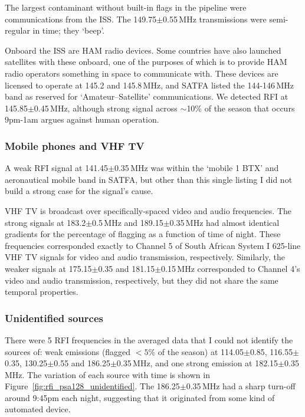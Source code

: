 The largest contaminant without built-in flags in the pipeline were communications from the ISS. The 149.75$\pm$0.55\,MHz transmissions were semi-regular in time; they `beep'. 

Onboard the ISS are HAM radio devices. Some countries have also launched satellites with these onboard, one of the purposes of which is to provide HAM radio operators something in space to communicate with. These devices are licensed to operate at 145.2 and 145.8\,MHz, and SATFA listed the 144-146\,MHz band as reserved for `Amateur--Satellite' communications. We detected RFI at 145.85$\pm$0.45\,MHz, although strong signal across $\sim$10\% of the season that occurs 9pm-1am argues against human operation.

\subsubsection*{Mobile phones and VHF TV}
A weak RFI signal at 141.45$\pm$0.35\,MHz was within the `mobile 1 BTX'  and aeronautical mobile band in SATFA, but other than this single listing I did not build a strong case for the signal's cause.

VHF TV is broadcast over specifically-spaced video and audio frequencies. The strong signals at 183.2$\pm$0.5\,MHz and 189.15$\pm$0.35\,MHz had almost identical gradients for the percentage of flagging as a function of time of night. These frequencies corresponded exactly to Channel 5 of South African System I 625-line VHF TV signals for video and audio transmission, respectively. Similarly, the weaker signals at 175.15$\pm$0.35	 and 181.15$\pm$0.15\,MHz corresponded to Channel 4's video and audio transmission, respectively, but they did not share the same temporal properties.

\subsubsection*{Unidentified sources}

There were 5 RFI frequencies in the averaged data that I could not identify the sources of:  weak emissions (flagged $<5\%$ of the season) at 114.05$\pm$0.85, 116.55$\pm$0.35, 130.25$\pm$0.55 and 186.25$\pm$0.35\,MHz, and one strong emission at 182.15$\pm$0.35\,MHz. The variation of each source with time is shown in Figure~\ref{fig:rfi_psa128_unidentified}. The 186.25$\pm$0.35\,MHz had a sharp turn-off around 9:45pm each night, suggesting that it originated from some kind of automated device.\\

